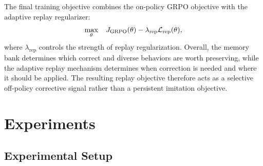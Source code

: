 \documentclass[11pt]{article}
\begin{document}
The final training objective combines the on-policy GRPO objective with the adaptive replay regularizer:
\begin{equation}\small
    \max_\theta
    \quad
    J_{\mathrm{GRPO}}(\theta)
    -
    \lambda_{\mathrm{rep}}
    \mathcal{L}_{\mathrm{rep}}(\theta),
\end{equation}
where $\lambda_{\mathrm{rep}}$ controls the strength of replay regularization. 
Overall, the memory bank determines which correct and diverse behaviors are worth preserving, while the adaptive replay mechanism determines when correction is needed and where it should be applied. The resulting replay objective therefore acts as a selective off-policy corrective signal rather than a persistent imitation objective.

\section{Experiments}

\subsection{Experimental Setup}
\end{document}
